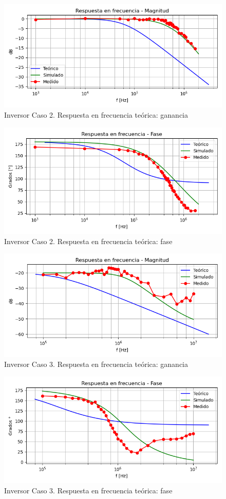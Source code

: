 \begin{figure}[H]
	\centering
		\includegraphics[width=.8\linewidth]{./Imagenes/InvCaso2Gain.png}  
		\caption{Inversor Caso 2. Respuesta en frecuencia teórica: ganancia}
	\label{fig:circinvcaso1}
\end{figure}

\begin{figure}[H]
	\centering
		\includegraphics[width=.8\linewidth]{./Imagenes/InvCaso2Phase.png}  
		\caption{Inversor Caso 2. Respuesta en frecuencia teórica: fase}
	\label{fig:circinvcaso1}
\end{figure}

\begin{figure}[H]
	\centering
		\includegraphics[width=.8\linewidth]{./Imagenes/InvCaso3Gain.png}  
		\caption{Inversor Caso 3. Respuesta en frecuencia teórica: ganancia}
	\label{fig:circinvcaso1}
\end{figure}

\begin{figure}[H]
	\centering
		\includegraphics[width=.8\linewidth]{./Imagenes/InvCaso3Phase.png}  
		\caption{Inversor Caso 3. Respuesta en frecuencia teórica: fase}
	\label{fig:circinvcaso1}
\end{figure}


